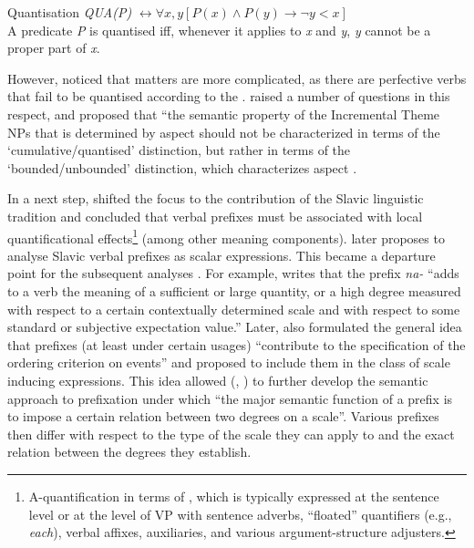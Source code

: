 \theoremstyle{definition}
\begin{definition}{Quantisation}\label{def:quant}
\textit{QUA(P)} $\leftrightarrow \forall x,y[P(x) \wedge P(y) \rightarrow \neg y<x]$\\
A predicate \textit{P} is quantised iff, whenever it applies to \textit{x} and \textit{y}, \textit{y} cannot be a proper part of \textit{x}.
\end{definition}

However, \citet{Filip:92} noticed that matters are more complicated, as there are perfective verbs that fail to be quantised according to the . \citet{Filip:92} raised a number of questions in this respect, and proposed that ``the semantic property of the Incremental Theme NPs that is determined by aspect should not be characterized in terms of the `cumulative/quantised' distinction, but rather in terms of the `bounded/unbounded' distinction, which characterizes aspect \citep[][147]{Filip:92}.

In a next step, \citet{Filip:92} shifted the focus to the contribution of the Slavic linguistic tradition \citep{Wierzbicka:67, Rassudova:75, Merrill:85} and concluded that verbal prefixes must be associated with local quantificational effects\footnote{A-quantification in terms of \citealt{BachPartee:87, BachPartee:95}, which is typically expressed at the sentence level or at the level of VP with sentence adverbs, ``floated'' quantifiers (e.g., \textit{each}), verbal affixes, auxiliaries, and various argument-structure adjusters.} (among other meaning components). \citet{Filip:99} later proposes to analyse Slavic verbal prefixes as scalar expressions. This became a departure point for the subsequent analyses \citep{Filip:00, Filip:03, Filip:05, FilipRothstein:05, Kagan:11, Kagan:12, Kagan:13, Kagan:book}. For example, \citet[183]{Filip:99} writes that the prefix \textit{na-} ``adds to a verb the meaning of a sufficient or large quantity, or a high degree measured with respect to a certain contextually determined scale and with respect to some standard or subjective expectation value.'' Later, \citet{Filip:08} also formulated the general idea that prefixes (at least under certain usages) ``contribute to the specification of the ordering criterion on events'' and proposed to include them in the class of scale inducing expressions. This idea allowed \citeauthor{Kagan:12} (\citeyear{Kagan:12}, \citeyear{Kagan:book}) to further develop the semantic approach to prefixation under which ``the major semantic function of a prefix is to impose a certain relation between two degrees on a scale''. Various prefixes then differ with respect to the type of the scale they can apply to and the exact relation between the degrees  they establish. 

